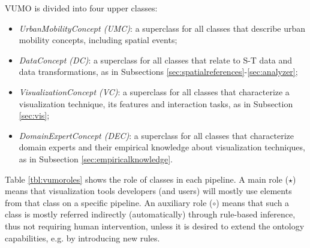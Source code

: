 \documentclass[]{interact}
\theoremstyle{plain}%
\theoremstyle{definition}
\theoremstyle{remark}
\theoremstyle{definition}
\begin{document}



VUMO is divided into four upper classes:

\begin{itemize}
	\item \emph{UrbanMobilityConcept (UMC)}: a superclass for all classes that describe urban mobility concepts, including spatial events;
	\item \emph{DataConcept (DC)}: a superclass for all classes that relate to S-T data and data transformations, as in Subsections \ref{sec:spatialreferences}-\ref{sec:analyzer};
	\item \emph{VisualizationConcept (VC)}: a superclass for all classes that characterize a visualization technique, its features and interaction tasks, as in Subsection \ref{sec:vis};
	\item \emph{DomainExpertConcept (DEC)}: a superclass for all classes that characterize domain experts and their empirical knowledge about visualization techniques, as in Subsection \ref{sec:empiricalknowledge}.
\end{itemize}

Table \ref{tbl:vumoroles} shows the role of classes in each pipeline. A main role ($\star$) means that visualization tools developers (and users) will mostly use elements from that class on a specific pipeline. An auxiliary role ($\circ$) means that such a class is mostly referred indirectly (automatically) through rule-based inference, thus not requiring human intervention, unless it is desired to extend the ontology capabilities, e.g. by introducing new rules.
\end{document}
